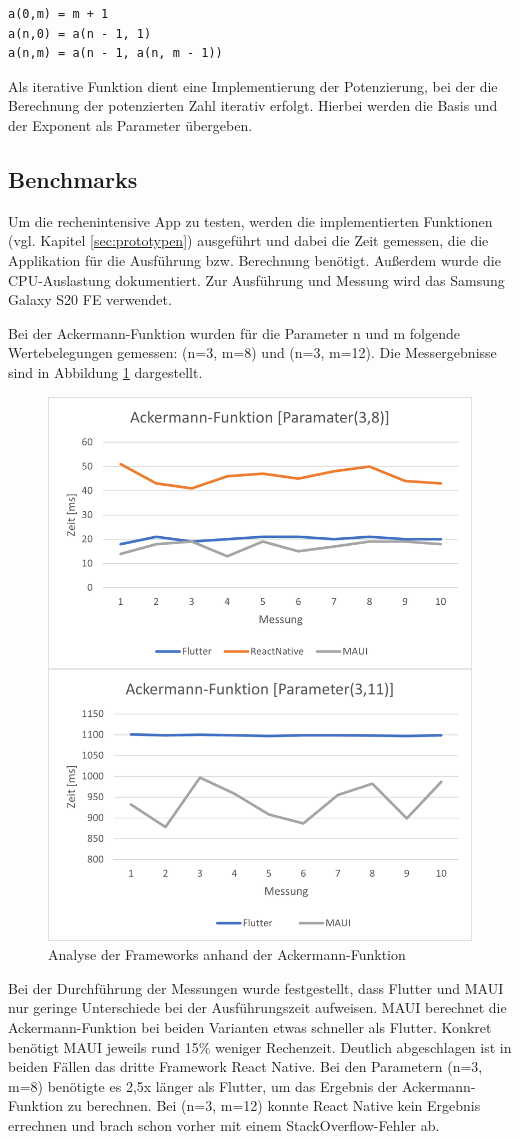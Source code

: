 \documentclass[]{lni}
\begin{document}
\begin{lstlisting}[label={lst:Ackermann-Funktion}]
a(0,m) = m + 1
a(n,0) = a(n - 1, 1)
a(n,m) = a(n - 1, a(n, m - 1))
\end{lstlisting}

Als iterative Funktion dient eine Implementierung der Potenzierung, bei der die Berechnung der potenzierten Zahl iterativ erfolgt. Hierbei werden die Basis und der Exponent als Parameter übergeben. 


\subsection{Benchmarks} \label{sec:benchmarking}
Um die rechenintensive App zu testen, werden die implementierten Funktionen (vgl. Kapitel \ref{sec:prototypen}) ausgeführt und dabei die Zeit gemessen, die die Applikation für die Ausführung bzw. Berechnung benötigt. Außerdem wurde die CPU-Auslastung dokumentiert. Zur Ausführung und Messung wird das Samsung Galaxy S20 FE verwendet.

Bei der Ackermann-Funktion wurden für die Parameter n und m folgende Wertebelegungen gemessen: (n=3, m=8) und (n=3, m=12). Die Messergebnisse sind in Abbildung \ref{fig:ackerman} dargestellt. 
\begin{figure}[ht]
	\centering
	\includegraphics[width=0.75\linewidth]{images/ackermann}
	\caption{Analyse der Frameworks anhand der Ackermann-Funktion}
	\label{fig:ackerman}
\end{figure}
Bei der Durchführung der Messungen wurde festgestellt, dass Flutter und MAUI nur geringe Unterschiede bei der Ausführungszeit aufweisen. MAUI berechnet die Ackermann-Funktion bei beiden Varianten etwas schneller als Flutter. Konkret benötigt MAUI jeweils rund 15\% weniger Rechenzeit. Deutlich abgeschlagen ist in beiden Fällen das dritte Framework React Native. Bei den Parametern (n=3, m=8) benötigte es 2,5x länger als Flutter, um das Ergebnis der Ackermann-Funktion zu berechnen. Bei (n=3, m=12) konnte React Native kein Ergebnis errechnen und brach schon vorher mit einem StackOverflow-Fehler ab.
\end{document}
